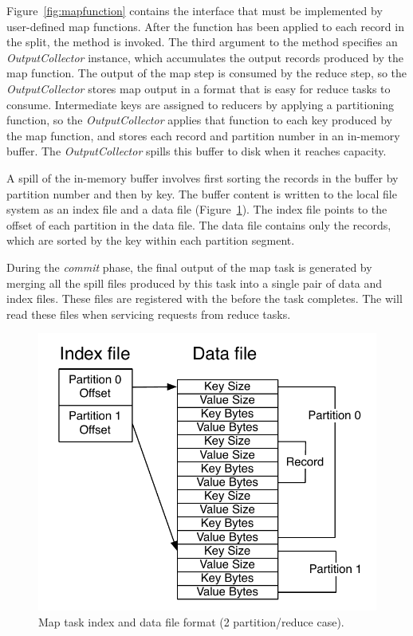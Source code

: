 Figure~\ref{fig:mapfunction} contains the interface that must be implemented by
user-defined map functions.  After the 
function has been applied to each record in the split, the  method is
invoked.  The third argument to the  method specifies an {\em
OutputCollector} instance, which accumulates the output records produced by the
map function.  The output of the map step is consumed by the reduce step, so
the {\em OutputCollector} stores map output in a format that is easy for reduce
tasks to consume.  Intermediate keys are assigned to reducers by applying a
partitioning function, so the {\em OutputCollector} applies that function to each key
produced by the map function, and stores each record and partition number in an
in-memory buffer.  The {\em OutputCollector} spills this buffer to disk when it
reaches capacity.

A spill of the in-memory buffer involves first sorting the records in the
buffer by partition number and then by key.  The buffer content is written to
the local file system as an index file and a data file
(Figure~\ref{ch:hadoop:fig:mapoutput}).  The index file points to the offset of
each partition in the data file.  The data file contains only the records,
which are sorted by the key within each partition segment.

During the {\em commit} phase, the final output of the map task is generated
by merging all the spill files produced by this task into a single pair of data
and index files.  These files are registered with the {\TT} before the task
completes.  The \TT will read these files when servicing requests from reduce
tasks.

\begin{figure}[t]
  \ssp
  \centering
  \includegraphics[scale=0.8]{figures/spill_file.pdf}
  \caption{Map task index and data file format (2 partition/reduce case).}
  \label{ch:hadoop:fig:mapoutput}
\end{figure}

